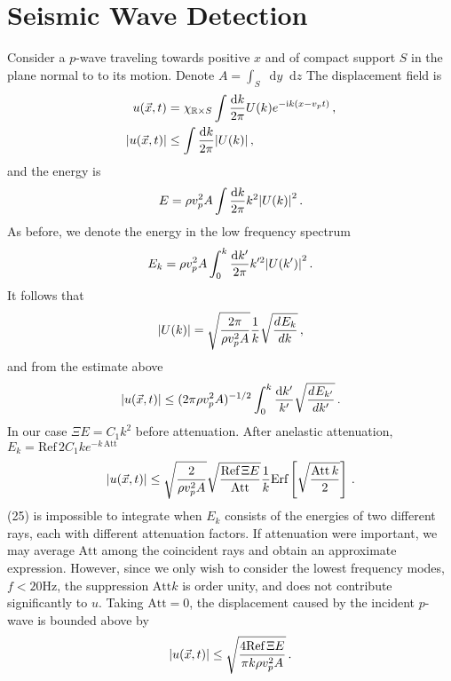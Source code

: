 \documentclass[prd,reprint,10pt]{revtex4-1}
\newcommand*\diff{\mathop{}\!\mathrm{d}}
\newcommand*\R{\mathbb R}
\newcommand*\te[1]{\text{#1}}
\newcommand*\ps[1]{\left[#1\right]}
\newcommand*\f[2]{\frac{#1}{#2}}
\newcommand*\I{\te{i}}
\newcommand*\td[3]{\frac{d^{#3}#1}{d #2^{#3}}}
\begin{document}
\section{Seismic Wave Detection}
Consider a $p$-wave traveling towards positive $x$ and of compact support $S$ in the plane normal to to its motion. Denote $A =\int_S\diff y\diff z$ The displacement field is
\begin{align}
u(\vec x,t) &= \chi_{\R\times S}\int\f{\diff k}{2\pi}U(k)e^{-\I k(x-v_p t)}\,,\\
\abs{u(\vec x,t)}&\leq\int\f{\diff k}{2\pi}\abs{U(k)}\,,
\end{align}
and the energy is
\begin{align}
E = \rho v_p^2 A\int\f{\diff k}{2\pi}k^2\abs{U(k)}^2\,.
\end{align}
As before, we denote the energy in the low frequency spectrum
\begin{align}
E_k = \rho v_p^2 A\int_0^k\f{\diff k'}{2\pi}k'^2\abs{U(k')}^2\,.
\end{align}
It follows that
\begin{align}
\abs{U(k)} = \sqrt{\f{2\pi}{\rho v_p^2 A}}\f1k\sqrt{\td{E_k}{k}{}}\,,
\end{align}
and from the estimate above
\begin{align}
\abs{u(\vec x,t)}\leq(2\pi\rho v_p^2 A)^{-1/2}\int_0^k\f{\diff k'}{k'}\sqrt{\td{E_{k'}}{k'}{}}\,.
\end{align}
In our case $\Xi E= C_1 k^2$ before attenuation. After anelastic attenuation, $E_k =\te{Ref}\,2C_1 k e^{-k\,\te{Att}}$
\begin{align}
\abs{u(\vec x,t)}\leq\sqrt{\f{2}{\rho v_p^2 A}}\sqrt{\f{\te{Ref}\,\Xi E}{\te{Att}}}\f1k\te{Erf}\ps{\sqrt{\f{\te{Att}\,k}{2}}}\,.
\end{align}
(25) is impossible to integrate when $E_k$ consists of the energies of two different rays, each with different attenuation factors. If attenuation were important, we may average $\te{Att}$ among the coincident rays and obtain an approximate expression. However, since we only wish to consider the lowest frequency modes, $f<20\te{Hz}$, the suppression $\te{Att} k$ is order unity, and does not contribute significantly to $u$. Taking $\te{Att} = 0$, the displacement caused by the incident $p$-wave is bounded above by
\begin{align}
\abs{u(\vec x,t)}\leq\sqrt{\f{4\te{Ref}\,\Xi E}{\pi k\rho v_p^2 A}}\,.
\end{align}
\end{document}
